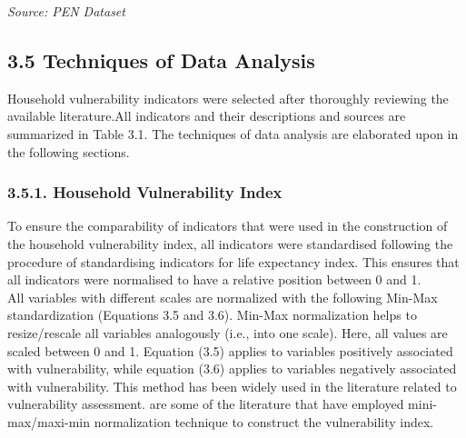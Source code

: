\documentclass[12pt, a4paper]{article}
\begin{document}
\begin{center}
\begin{table}[ht]
	\renewcommand{\arraystretch}{1.2} 
	\captionsetup{labelformat=empty}
	\caption{Table 3.2: Definition of Variables affecting HVI}
	\vspace{0.05cm}
	\small{\textit{Source: PEN Dataset}}
\end{table}
\end{center}
\subsection*{3.5 Techniques of Data Analysis}
\renewcommand{\thepage}{\arabic{page}}
Household vulnerability indicators were selected after thoroughly reviewing the 
available literature.All indicators and their descriptions 
and sources are summarized in Table 3.1. The techniques of data analysis are elaborated upon in the following sections. 
\subsubsection{3.5.1. Household Vulnerability Index}
\renewcommand{\thepage}{\arabic{page}}
To ensure the comparability of indicators that were used in the construction of the
household vulnerability index, all indicators were standardised following the
\citep{watkins2007human} procedure of standardising indicators for life expectancy index. This
ensures that all indicators were normalised to have a relative position between 0 and 1. \\
All variables with different scales are normalized with the following Min-Max standardization 
(Equations 3.5 and 3.6). Min-Max normalization helps to resize/rescale all variables analogously 
(i.e., into one scale). Here, all values are scaled between 0 and 1. Equation (3.5) applies to 
variables positively associated with vulnerability, while 
equation (3.6) applies to variables negatively associated with vulnerability. This method has been widely used in the literature related to vulnerability assessment. \cite{fang2016rural, antwi2013characterising, karunarathne2020developing, huynh2018multi, dumenu2020social} are some of the literature that have employed mini-max/maxi-min normalization technique to construct the vulnerability index.
\end{document}
